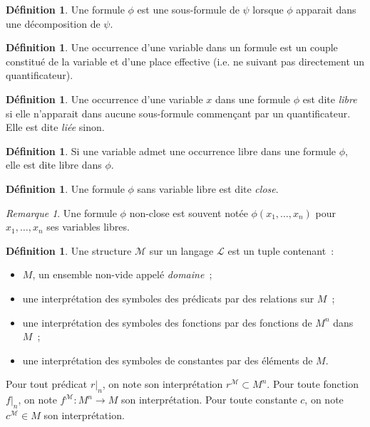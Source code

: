 \documentclass{article}
\theoremstyle{definition}
\newtheorem{déf}[thm]{Définition}
\theoremstyle{remark}
\newtheorem*{rmq}{Remarque}
\begin{document}
	\begin{déf} Une formule $\phi$ est une sous-formule de $\psi$ lorsque $\phi$ apparait dans une décomposition de $\psi$.
	\end{déf}

	\begin{déf} Une occurrence d'une variable dans un formule est un couple constitué de la variable et d'une place effective (i.e. ne suivant pas directement
	un quantificateur).
	\end{déf}

	\begin{déf} Une occurrence d'une variable $x$ dans une formule $\phi$ est dite \textit{libre} si elle n'apparait dans aucune sous-formule commençant par
	un quantificateur. Elle est dite \textit{liée} sinon.
	\end{déf}

	\begin{déf} Si une variable admet une occurrence libre dans une formule $\phi$, elle est dite libre dans $\phi$.
	\end{déf}

	\begin{déf} Une formule $\phi$ sans variable libre est dite \textit{close}.
	\end{déf}

	\begin{rmq} Une formule $\phi$ non-close est souvent notée $\phi(x_1, \ldots, x_n)$ pour $x_1, \ldots, x_n$ ses variables libres.
	\end{rmq}

	\begin{déf} Une structure $\mathcal M$ sur un langage $\mathcal L$ est un tuple contenant~:
	\begin{itemize}
		\item $M$, un ensemble non-vide appelé \textit{domaine}~;
		\item une interprétation des symboles des prédicats par des relations sur $M$~;
		\item une interprétation des symboles des fonctions par des fonctions de $M^n$ dans $M$~;
		\item une interprétation des symboles de constantes par des éléments de $M$.
	\end{itemize}

	Pour tout prédicat $r|_n$, on note son interprétation $r^{\mathcal M} \subset M^n$. Pour toute fonction $f|_n$, on note $f^{\mathcal M} : M^n \to M$
	son interprétation. Pour toute constante $c$, on note $c^{\mathcal M} \in M$ son interprétation.
	\end{déf}
\end{document}
